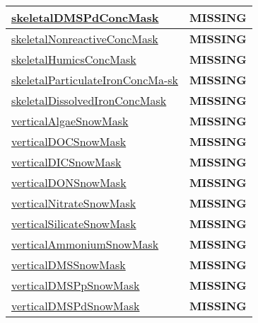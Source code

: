 {\begin{center}
\begin{longtable}{| p{2.0in} | p{4.0in} |}
    \hline
    \hyperref[subsec:var_sec_tracer_masks_skeletalDMSPdConcMask]{skeletalDMSPdConcMask} & {\bf \color{red} MISSING} \\
    \hline
    \hyperref[subsec:var_sec_tracer_masks_skeletalNonreactiveConcMask]{skeletalNonreactiveConcMask} & {\bf \color{red} MISSING} \\
    \hline
    \hyperref[subsec:var_sec_tracer_masks_skeletalHumicsConcMask]{skeletalHumicsConcMask} & {\bf \color{red} MISSING} \\
    \hline
    \hyperref[subsec:var_sec_tracer_masks_skeletalParticulateIronConcMask]{skeletalParticulateIronConcMa-}\hyperref[subsec:var_sec_tracer_masks_skeletalParticulateIronConcMask]{sk  }& {\bf \color{red} MISSING} \\
    \hline
    \hyperref[subsec:var_sec_tracer_masks_skeletalDissolvedIronConcMask]{skeletalDissolvedIronConcMask} & {\bf \color{red} MISSING} \\
    \hline
    \hyperref[subsec:var_sec_tracer_masks_verticalAlgaeSnowMask]{verticalAlgaeSnowMask} & {\bf \color{red} MISSING} \\
    \hline
    \hyperref[subsec:var_sec_tracer_masks_verticalDOCSnowMask]{verticalDOCSnowMask} & {\bf \color{red} MISSING} \\
    \hline
    \hyperref[subsec:var_sec_tracer_masks_verticalDICSnowMask]{verticalDICSnowMask} & {\bf \color{red} MISSING} \\
    \hline
    \hyperref[subsec:var_sec_tracer_masks_verticalDONSnowMask]{verticalDONSnowMask} & {\bf \color{red} MISSING} \\
    \hline
    \hyperref[subsec:var_sec_tracer_masks_verticalNitrateSnowMask]{verticalNitrateSnowMask} & {\bf \color{red} MISSING} \\
    \hline
    \hyperref[subsec:var_sec_tracer_masks_verticalSilicateSnowMask]{verticalSilicateSnowMask} & {\bf \color{red} MISSING} \\
    \hline
    \hyperref[subsec:var_sec_tracer_masks_verticalAmmoniumSnowMask]{verticalAmmoniumSnowMask} & {\bf \color{red} MISSING} \\
    \hline
    \hyperref[subsec:var_sec_tracer_masks_verticalDMSSnowMask]{verticalDMSSnowMask} & {\bf \color{red} MISSING} \\
    \hline
    \hyperref[subsec:var_sec_tracer_masks_verticalDMSPpSnowMask]{verticalDMSPpSnowMask} & {\bf \color{red} MISSING} \\
    \hline
    \hyperref[subsec:var_sec_tracer_masks_verticalDMSPdSnowMask]{verticalDMSPdSnowMask} & {\bf \color{red} MISSING} \\

\end{longtable}
\end{center}}
